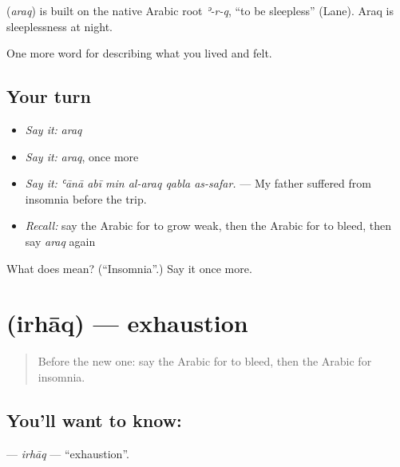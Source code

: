 \begin{cousinweb}
\textbf{} (\emph{araq}) is built on the native Arabic root \emph{ʾ-r-q}, \textquotedblleft{}to be sleepless\textquotedblright{} (Lane). Araq is sleeplessness at night.
\end{cousinweb}

\begin{grammarlens}[title={What you've built}]
One more word for describing what you lived and felt.
\end{grammarlens}

\subsection*{Your turn}
\begin{itemize}
\raggedright
  \item \emph{Say it:} \emph{araq}
  \item \emph{Say it:} \emph{araq}, once more
  \item \emph{Say it:} \emph{ʿānā abī min al-araq qabla as-safar.} — My father suffered from insomnia before the trip.
  \item \emph{Recall:} say the Arabic for to grow weak, then the Arabic for to bleed, then say \emph{araq} again
\end{itemize}

\begin{tcolorbox}[breakable,colback=teal!4,colframe=teal!35!black,title={Before you move on}]
What does  mean? (\textquotedblleft{}Insomnia\textquotedblright{}.) Say it once more.
\end{tcolorbox}
\section[\texorpdfstring{\ar{إرهاق} (irhāq)}{إرهاق (irhāq)}]{ (irhāq) — exhaustion}

\label{lesson:AR-C514-irhaq}



\begin{quote}
Before the new one: say the Arabic for to bleed, then the Arabic for insomnia.
\end{quote}

\subsection*{You'll want to know: }
\textbf{} — \emph{irhāq} — \textquotedblleft{}exhaustion\textquotedblright{}.

